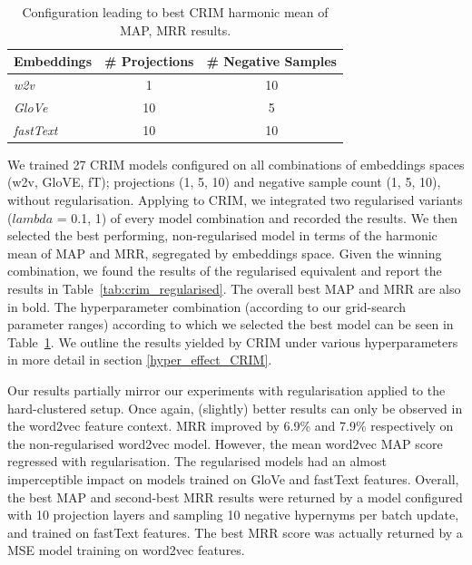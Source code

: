 \begin{table}\centering
\begin{tabular}{@{}lcc@{}}\toprule
\textbf{Embeddings} & \textbf{\# Projections} & \textbf{\# Negative Samples}\\
\midrule
\textit{w2v} & 1 & 10\\
\textit{GloVe} & 10 & 5\\
\textit{fastText} & 10 & 10\\
\bottomrule
\end{tabular}
\caption{Configuration leading to best CRIM harmonic mean of \ac{MAP}, \ac{MRR} results.}\label{tab:crim_best_parameter_combination}
\end{table}

We trained 27 CRIM models configured on all combinations of embeddings spaces (w2v, GloVE, fT); projections (1, 5, 10) and negative sample count (1, 5, 10), without regularisation.  Applying \citep{ustalov2017negative} to CRIM, we integrated two regularised variants ($lambda$ = 0.1, 1) of every model combination and recorded the results.  We then selected the best performing, non-regularised model in terms of the harmonic mean of \ac{MAP} and \ac{MRR}, segregated by embeddings space.  Given the winning combination, we found the results of the regularised equivalent and report the results in Table~\ref{tab:crim_regularised}.  The overall best \ac{MAP} and \ac{MRR} are also in bold.  The hyperparameter combination (according to our grid-search parameter ranges) according to which we selected the best model can be seen in Table~\ref{tab:crim_best_parameter_combination}.  We outline the results yielded by CRIM under various hyperparameters in more detail in section \ref{hyper_effect_CRIM}.

Our results partially mirror our experiments with regularisation applied to the hard-clustered setup.  Once again, (slightly) better results can only be observed in the word2vec feature context.  \ac{MRR} improved by 6.9\% and 7.9\% respectively on the non-regularised word2vec model.  However, the mean word2vec \ac{MAP} score regressed with regularisation.  The regularised models had an almost imperceptible impact on models trained on GloVe and fastText features.  Overall, the best \ac{MAP} and second-best \ac{MRR} results were returned by a model configured with 10 projection layers and sampling 10 negative hypernyms per batch update, and trained on fastText features.  The best \ac{MRR} score was actually returned by a \ac{MSE} model training on word2vec features.

